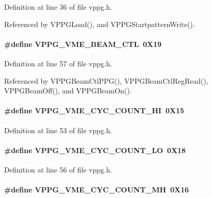 Definition at line 36 of file vppg.h.

Referenced by VPPGLoad(), and VPPGStartpatternWrite().
\paragraph[{VPPG\_\-VME\_\-BEAM\_\-CTL}]{\setlength{\rightskip}{0pt plus 5cm}\#define VPPG\_\-VME\_\-BEAM\_\-CTL~0X19}\hfill\label{vppg_8h_a8b01a76c63d10faead8824b1b656c120}


Definition at line 57 of file vppg.h.

Referenced by VPPGBeamCtlPPG(), VPPGBeamCtlRegRead(), VPPGBeamOff(), and VPPGBeamOn().
\paragraph[{VPPG\_\-VME\_\-CYC\_\-COUNT\_\-HI}]{\setlength{\rightskip}{0pt plus 5cm}\#define VPPG\_\-VME\_\-CYC\_\-COUNT\_\-HI~0X15}\hfill\label{vppg_8h_a001dc16c3c332d8be1a321fde4897dd1}


Definition at line 53 of file vppg.h.
\paragraph[{VPPG\_\-VME\_\-CYC\_\-COUNT\_\-LO}]{\setlength{\rightskip}{0pt plus 5cm}\#define VPPG\_\-VME\_\-CYC\_\-COUNT\_\-LO~0X18}\hfill\label{vppg_8h_a5bec178c49a61c6934333ae6933c9ba5}


Definition at line 56 of file vppg.h.
\paragraph[{VPPG\_\-VME\_\-CYC\_\-COUNT\_\-MH}]{\setlength{\rightskip}{0pt plus 5cm}\#define VPPG\_\-VME\_\-CYC\_\-COUNT\_\-MH~0X16}\hfill\label{vppg_8h_ac0e9d0d4625b97599cfff38e73a7c360}


